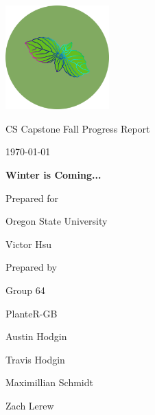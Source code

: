 \documentclass[onecolumn, draftclsnofoot,10pt, compsoc]{IEEEtran}
\def \CapstoneTeamName{			              			 PlanteR-GB}
\def \CapstoneTeamNumber{					           			 Group 64}
\def \GroupMemberOne{				           				Austin Hodgin}
\def \GroupMemberTwo{				           				Travis Hodgin}
\def \GroupMemberThree{			            Maximillian Schmidt}
\def\GroupMemberFour{		        	               Zach Lerew}
\def \CapstoneProjectName{	      	    Winter is Coming...}
\def \CapstoneSponsorCompany{		    Oregon State University}
\def \CapstoneSponsorPerson{		 			  				 Victor Hsu}
\def \DocType{		%
				Fall Progress Report
				}
\newcommand{\NameSigPair}[1]{\par
\makebox[2.75in][r]{#1} \hfil 	\makebox[3.25in]{\makebox[2.25in]{\hrulefill} \hfill		\makebox[.75in]{\hrulefill}}
\par\vspace{-12pt} \textit{\tiny\noindent
\makebox[2.75in]{} \hfil		\makebox[3.25in]{\makebox[2.25in][r]{Signature} \hfill	\makebox[.75in][r]{Date}}}}
\renewcommand{\NameSigPair}[1]{#1}
\begin{document}
\begin{titlepage}
    \begin{singlespace}
        \hfill

        \includegraphics[height=4cm]{logo.png}

        \par\vspace{.2in}
        \centering
        \scshape{
            \huge CS Capstone \DocType \par
            {\large\today}\par
            \vspace{.5in}
            \textbf{\Huge\CapstoneProjectName}\par

						\vspace{1in}

            {\large Prepared for}\par
            \Huge \CapstoneSponsorCompany\par
            \vspace{5pt}
            {\Large\NameSigPair{\CapstoneSponsorPerson}\par}

						\vspace{1in}

            {\large Prepared by}\par
						{\huge \CapstoneTeamNumber}\par
            \CapstoneTeamName\par
            \vspace{5pt}

            {
							\Large
							\NameSigPair{\GroupMemberOne}\par
							\NameSigPair{\GroupMemberTwo}\par
							\NameSigPair{\GroupMemberThree}\par
							\NameSigPair{\GroupMemberFour}\par
            }

}
\end{singlespace}
\end{titlepage}
\end{document}
